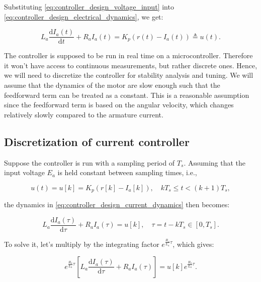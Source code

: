 Substituting \cref{eq:controller_design_voltage_input} into \cref{eq:controller_design_electrical_dynamics}, we get:

\begin{equation}
    \label{eq:controller_design_current_dynamics}
    L_a \frac{\mathrm{d}I_a(t)}{\mathrm{d}t} + R_a I_a(t) = K_p (r(t) - I_a(t)) \triangleq u(t).
\end{equation}

The controller is supposed to be run in real time on a microcontroller. Therefore it won't have access to continuous measurements, but rather discrete ones. Hence, we will need to discretize the controller for stability analysis and tuning. We will assume that the dynamics of the motor are slow enough such that the feedforward term can be treated as a constant. This is a reasonable assumption since the feedforward term is based on the angular velocity, which changes relatively slowly compared to the armature current.

\subsection{Discretization of current controller}
Suppose the controller is run with a sampling period of $T_s$. Assuming that the input voltage $E_a$ is held constant between sampling times, i.e.,

\begin{equation}
    \label{eq:controller_design_discretized_input}
    u(t)=u[k] = K_p (r[k] - I_a[k]), \quad k T_s \leq t < (k+1)T_s,
\end{equation}

the dynamics in \cref{eq:controller_design_current_dynamics} then becomes:

\begin{equation}
    \label{eq:controller_design_current_interval_dynamics}
    L_a \frac{\mathrm{d}I_a(\tau)}{\mathrm{d}\tau} + R_a I_a(\tau) = u[k], \quad \tau = t - k T_s \in [0, T_s].
\end{equation}

To solve it, let's multiply by the integrating factor $e^{\frac{R_a}{L_a} \tau}$, which gives:

\begin{equation}
    \label{eq:controller_design_current_integrating_factor}
    e^{\frac{R_a}{L_a} \tau} \left[L_a \frac{\mathrm{d}I_a(\tau)}{\mathrm{d}\tau} + R_a I_a(\tau)\right] = u[k] e^{\frac{R_a}{L_a} \tau}.
\end{equation}

